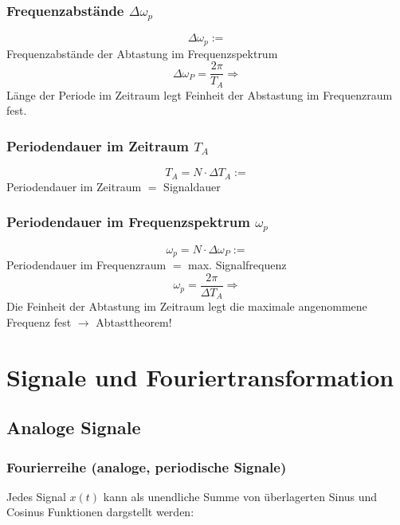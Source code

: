 \documentclass[12pt,a4paper]{scrartcl}
\begin{document}
\subsubsection{Frequenzabstände $\Delta \omega_p$}
\label{sec:sub:sub:delta-omega-p}
$$\Delta \omega_p :=$$ Frequenzabstände der Abtastung im Frequenzspektrum \\
$$\Delta \omega_P = \frac{2\pi}{T_A} \Rightarrow$$ Länge der Periode im Zeitraum legt Feinheit der Abstastung im Frequenzraum fest.

\subsubsection{Periodendauer im Zeitraum $T_A$}
\label{sec:sub:sub:t-a}
$$T_A = N \cdot \Delta T_A :=$$ Periodendauer im Zeitraum $=$ Signaldauer

\subsubsection{Periodendauer im Frequenzspektrum $\omega_p$}
\label{sec:sub:sub:omega-p}
$$\omega_p = N \cdot \Delta \omega_P :=$$ Periodendauer im Frequenzraum $=$ max. Signalfrequenz\\
$$\omega_p = \frac{2\pi}{\Delta T_A} \Rightarrow$$ Die Feinheit der Abtastung im Zeitraum legt die maximale angenommene Frequenz fest $\to$ Abtasttheorem!

\newpage
\section{Signale und Fouriertransformation}
\label{sec:signale-und-fouriertransformation}

\subsection{Analoge Signale}
\label{sec:sub:analoge-signale}

\subsubsection{Fourierreihe (analoge, periodische Signale)}
\label{sec:sub:sub:fourier-reihe}

Jedes Signal $x(t)$ kann als unendliche Summe von überlagerten Sinus und Cosinus Funktionen dargstellt werden: \\
\end{document}
